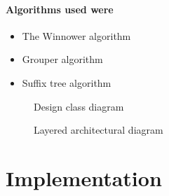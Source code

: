 \documentclass[11pt,a4paper]{article}
\begin{document}
\paragraph{Algorithms used were}
\begin{itemize}
    \item The Winnower algorithm
    \item Grouper algorithm
    \item Suffix tree algorithm
\end{itemize}

\begin{figure}[H]
  \caption{Design class diagram}
  \label{fig:designclass}
\end{figure}

\begin{figure}[H]
  \caption{Layered architectural diagram}
  \label{fig:layeredarchitecture}
\end{figure}



\section{Implementation}
\end{document}
